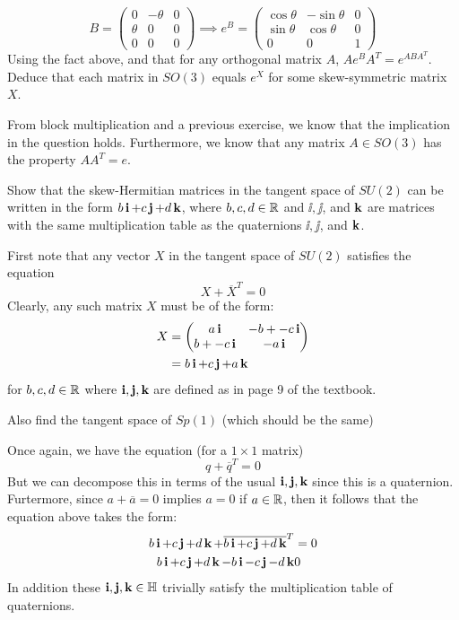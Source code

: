 \documentclass[12pt,onecolumn]{article}
\begin{document}
\begin{exercise}
$$ B = \begin{pmatrix} 0 & -\theta & 0 \\ \theta & 0 & 0 \\ 0 & 0 & 0 \end{pmatrix} \implies e^B = \begin{pmatrix} \cos{\theta} & -\sin{\theta} & 0 \\ \sin{\theta} & \cos{\theta} & 0 \\ 0 & 0 & 1 \end{pmatrix}  $$
Using the fact above, and that for any orthogonal matrix $A$,  $Ae^{B}A^T =e^{ABA^T}$. Deduce that each matrix in $SO(3)$ equals $e^X$ for some skew-symmetric matrix $X$.
\end{exercise}
\begin{answer}
From block multiplication and a previous exercise, we know that the implication in the question holds. Furthermore, we know that any matrix $A \in SO(3)$ has the property $AA^T = e$. 
\end{answer}
\begin{exercise}
Show that the skew-Hermitian matrices in the tangent space of $SU(2)$ can be written in the form $b\operatorname{\textbf{i}}+c\operatorname{\textbf{j}}+d\operatorname{\textbf{k}}$, where $b,c,d \in \operatorname{\mathbb{R}}$ and $\ii, \jj$, and $\operatorname{\textbf{k}}$ are matrices with the same multiplication table as the quaternions $\ii, \jj$, and $\operatorname{\textbf{k}}$.
\end{exercise}
\begin{answer}
First note that any vector $X$ in the tangent space of $SU(2)$ satisfies the equation
$$ X + \overline{X}^T = 0$$
Clearly, any such matrix $X$ must be of the form:
\begin{align*}
    X &= \begin{pmatrix} a\operatorname{\textbf{i}} & -b + -c\operatorname{\textbf{i}} \\ b + -c\operatorname{\textbf{i}} & -a\operatorname{\textbf{i}} \end{pmatrix} \\
    &= b \operatorname{\textbf{i}} + c \operatorname{\textbf{j}}  + a \operatorname{\textbf{k}} 
\end{align*}
for $b,c,d \in \operatorname{\mathbb{R}}$ where $\operatorname{\textbf{i}},\operatorname{\textbf{j}},\operatorname{\textbf{k}}$ are defined as in page 9 of the textbook.
\end{answer}
\begin{exercise}
Also find the tangent space of $Sp(1)$ (which should be the same)
\end{exercise}
\begin{answer}
Once again, we have the equation (for a $1\times 1$ matrix)
$$ q + \overline{q}^T = 0$$
But we can decompose this in terms of the usual $\operatorname{\textbf{i}},\operatorname{\textbf{j}},\operatorname{\textbf{k}}$ since this is a quaternion. Furtermore, since $a + \overline{a} = 0 $ implies $a =0$ if $a \in \operatorname{\mathbb{R}}$, then it follows that the equation above takes the form:
\begin{align*}
    b\operatorname{\textbf{i}} + c\operatorname{\textbf{j}} + d\operatorname{\textbf{k}} + \overline{b\operatorname{\textbf{i}} + c\operatorname{\textbf{j}} + d\operatorname{\textbf{k}}}^T &= 0 \\
    b \operatorname{\textbf{i}} + c\operatorname{\textbf{j}} + d \operatorname{\textbf{k}} -b\operatorname{\textbf{i}} -c\operatorname{\textbf{j}} -d\operatorname{\textbf{k}} &0
\end{align*}
In addition these $\operatorname{\textbf{i}},\operatorname{\textbf{j}},\operatorname{\textbf{k}} \in \mathbb{H}$ trivially satisfy the multiplication table of quaternions.
\end{answer}
\end{document}
